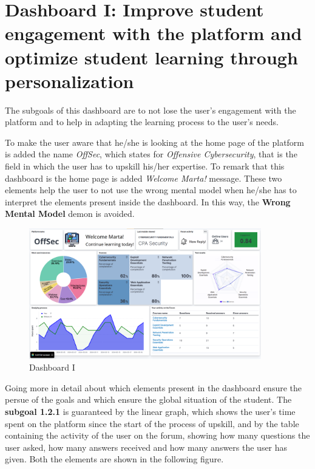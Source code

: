 \section{Dashboard I: Improve student engagement with the platform and optimize student learning through personalization}

The subgoals of this dashboard are to not lose the user's engagement with 
the platform and to help in adapting the learning process to the user's
needs. 

To make the user aware that he/she is looking
at the home page of the platform is added the name \textit{OffSec},
which states for \textit{Offensive Cybersecurity}, that is the field
in which the user has to upskill his/her expertise. To remark that this
dashboard is the home page is added \textit{Welcome Marta!} message.
These two elements help the user to not use the wrong mental model
when he/she has to interpret the elements present inside the dashboard.
In this way, the \textbf{Wrong Mental Model} demon is avoided.


\begin{figure}[H]
    \centering
    \includegraphics[width=0.9\textwidth]{assets/dashboard_1.png}
    \caption{Dashboard I}
    \label{fig:dashboard_1}
\end{figure}

Going more in detail about which elements present in the dashboard 
ensure the persue of the goals and which ensure the global situation
of the student. The \textbf{subgoal 1.2.1} is guaranteed by the linear graph,
which shows the user's time spent on the platform since the start of
the process of upskill, and by the table containing the activity of the
user on the forum, showing how many questions the user asked, how many
answers received and how many answers the user has given. 
Both the elements are shown in the following figure.

